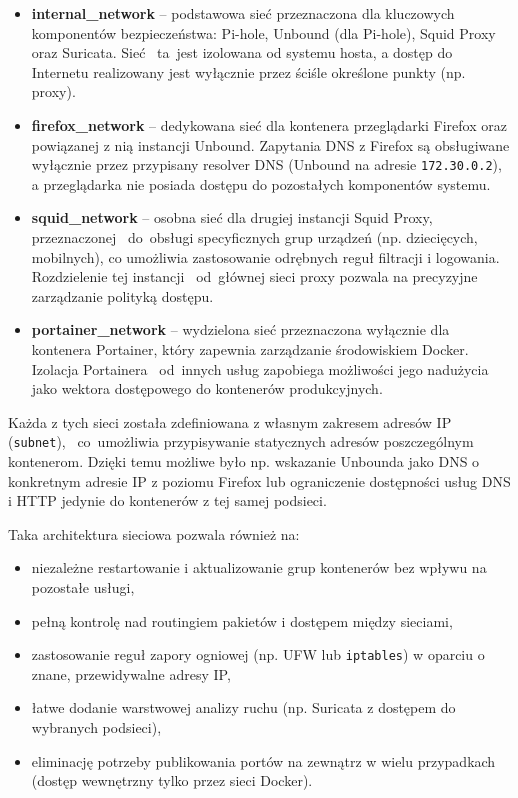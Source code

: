 \documentclass[
    left=2.5cm,         %
    right=2.5cm,        %
    top=2.5cm,          %
    bottom=3cm,         %
    bindingoffset=6mm,  %
    nohyphenation=true %
]{eiti/eiti-thesis} %
\begin{document}
\begin{itemize}
    \item \textbf{internal\_network} – podstawowa sieć przeznaczona dla kluczowych komponentów bezpieczeństwa: Pi-hole, Unbound (dla Pi-hole), Squid Proxy 
    oraz Suricata. Sieć ~ta~jest izolowana od systemu hosta, a dostęp do Internetu realizowany jest wyłącznie przez ściśle określone punkty (np. proxy).
    \item \textbf{firefox\_network} – dedykowana sieć dla kontenera przeglądarki Firefox oraz powiązanej z nią instancji Unbound. Zapytania DNS z Firefox są obsługiwane wyłącznie przez przypisany resolver DNS (Unbound na adresie \texttt{172.30.0.2}), a przeglądarka nie posiada dostępu do pozostałych komponentów systemu.
    \item \textbf{squid\_network} – osobna sieć dla drugiej instancji Squid Proxy, przeznaczonej ~do~obsługi specyficznych grup urządzeń (np. dziecięcych, mobilnych), co umożliwia zastosowanie odrębnych reguł filtracji i logowania. Rozdzielenie tej instancji ~od~głównej sieci proxy pozwala na precyzyjne zarządzanie polityką dostępu.
    \item \textbf{portainer\_network} – wydzielona sieć przeznaczona wyłącznie dla kontenera Portainer, który zapewnia zarządzanie środowiskiem Docker. Izolacja Portainera ~od~innych usług zapobiega możliwości jego nadużycia jako wektora dostępowego do kontenerów produkcyjnych.
\end{itemize}

Każda z tych sieci została zdefiniowana z własnym zakresem adresów IP (\texttt{subnet}), ~co~umożliwia przypisywanie statycznych adresów poszczególnym kontenerom. Dzięki temu możliwe było np. wskazanie Unbounda jako DNS o konkretnym adresie IP z poziomu Firefox lub ograniczenie dostępności usług DNS i HTTP jedynie do kontenerów z tej samej podsieci.

Taka architektura sieciowa pozwala również na:
\begin{itemize}
    \item niezależne restartowanie i aktualizowanie grup kontenerów bez wpływu na pozostałe usługi,
    \item pełną kontrolę nad routingiem pakietów i dostępem między sieciami,
    \item zastosowanie reguł zapory ogniowej (np. UFW lub \texttt{iptables}) w oparciu o znane, przewidywalne adresy IP,
    \item łatwe dodanie warstwowej analizy ruchu (np. Suricata z dostępem do wybranych podsieci),
    \item eliminację potrzeby publikowania portów na zewnątrz w wielu przypadkach (dostęp wewnętrzny tylko przez sieci Docker).
\end{itemize}
\end{document}
